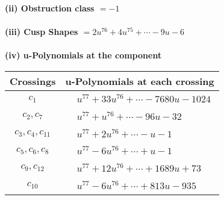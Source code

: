 \documentclass[1p]{elsarticle_modified}
\theoremstyle{definition}
\begin{document}
\flushleft \textbf{(ii) Obstruction class $= -1$}\\~\\
\flushleft \textbf{(iii) Cusp Shapes $= 2 u^{76}+4 u^{75}+\cdots-9 u-6$}\\~\\
\newpage\renewcommand{\arraystretch}{1}
\flushleft \textbf{(iv) u-Polynomials at the component}\newline \\
\begin{tabular}{m{50pt}|m{274pt}}
Crossings & \hspace{64pt}u-Polynomials at each crossing \\
\hline $$\begin{aligned}c_{1}\end{aligned}$$&$\begin{aligned}
&u^{77}+33 u^{76}+\cdots-7680 u-1024
\end{aligned}$\\
\hline $$\begin{aligned}c_{2},c_{7}\end{aligned}$$&$\begin{aligned}
&u^{77}+u^{76}+\cdots-96 u-32
\end{aligned}$\\
\hline $$\begin{aligned}c_{3},c_{4},c_{11}\end{aligned}$$&$\begin{aligned}
&u^{77}+2 u^{76}+\cdots- u-1
\end{aligned}$\\
\hline $$\begin{aligned}c_{5},c_{6},c_{8}\end{aligned}$$&$\begin{aligned}
&u^{77}-6 u^{76}+\cdots+u-1
\end{aligned}$\\
\hline $$\begin{aligned}c_{9},c_{12}\end{aligned}$$&$\begin{aligned}
&u^{77}+12 u^{76}+\cdots+1689 u+73
\end{aligned}$\\
\hline $$\begin{aligned}c_{10}\end{aligned}$$&$\begin{aligned}
&u^{77}-6 u^{76}+\cdots+813 u-935
\end{aligned}$\\
\hline
\end{tabular}\\~\\
\end{document}

